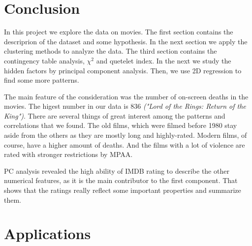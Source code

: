 \documentclass[a4paper,14pt]{article}
\begin{document}
 
\begin{center}
\end{center}


\section{Conclusion}

In this project we explore the data on movies. The first section contains the descriprion of the dataset and some hypothesis. In the next section we apply the clustering methods to analyze the data. The third section contains the contingency table analysis, $\chi^2$ and quetelet index. In the next we study the hidden factors by principal component analysis. Then, we use 2D regression to find some more patterns. 

The main feature of the consideration was the number of on-screen deaths in the movies. The higest number in our data is 836 \textit{("Lord of the Rings: Return of the King")}. 
There are several things of great interest among the patterns and correlations that we found. The old films, which were filmed before 1980 stay aside from the others  as they are mostly long and highly-rated. Modern films, of course, have a higher amount of deaths. And the films with a lot of violence are rated with stronger restrictions by MPAA. 

PC analysis revealed the high ability of IMDB rating to describe the other numerical features, as it is the main contributor to the first component. That shows that the ratings really reflect some important properties and summarize them.




    
    \section{Applications}
    
\end{document}
